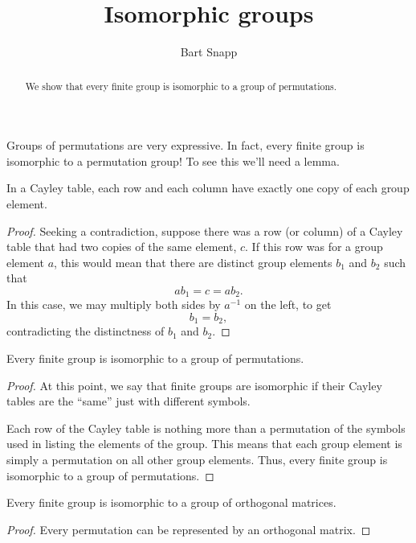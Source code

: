 \documentclass{ximera}
\author{Bart Snapp}
\title{Isomorphic groups}
\begin{document}
\begin{abstract}
  We show that every finite group is isomorphic to a group of
  permutations.
\end{abstract}
\maketitle

Groups of permutations are very expressive. In fact, every finite group
is isomorphic to a permutation group! To see this we'll need a lemma.

\begin{lemma}
  In a Cayley table, each row and each column have exactly one copy of
  each group element.
  \begin{proof}
    Seeking a contradiction, suppose there was a row (or column) of a
    Cayley table that had two copies of the same element, $c$. If this
    row was for a group element $a$, this would mean that there are
    distinct group elements $b_1$ and $b_2$ such that
    \[
    ab_1 =c = ab_2.
    \]
    In this case, we may multiply both sides by $a^{-1}$ on the left,
    to get
    \[
    b_1 = b_2,
    \]
    contradicting the distinctness of $b_1$ and $b_2$.
  \end{proof}
\end{lemma}


\begin{theorem}
  Every finite group is isomorphic to a group of permutations.
  \begin{proof}
    At this point, we say that finite groups are isomorphic if their
    Cayley tables are the ``same'' just with different symbols.


    Each row of the Cayley table is nothing more than a permutation of
    the symbols used in listing the elements of the group. This means
    that each group element is simply a permutation on all other group
    elements. Thus, every finite group is isomorphic to a group of
    permutations.
  \end{proof}
\end{theorem}

\begin{corollary}
  Every finite group is isomorphic to a group of orthogonal matrices.
  \begin{proof}
    Every permutation can be represented by an orthogonal matrix.
  \end{proof}
\end{corollary}
\end{document}
